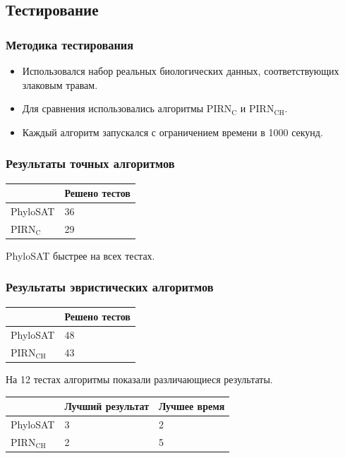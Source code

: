 \documentclass[hyperref={unicode}]{beamer}
\begin{document}
\subsection{Тестирование}

\begin{frame}
\frametitle{Методика тестирования}

\begin{itemize}
	\item Использовался набор реальных биологических данных, соответствующих злаковым травам.
	\item Для сравнения использовались алгоритмы $\mathrm{PIRN_C}$ и $\mathrm{PIRN_{CH}}$.
	\item Каждый алгоритм запускался с ограничением времени в 1000 секунд.
\end{itemize}

\end{frame}

\begin{frame}
\frametitle{Результаты точных алгоритмов}

\begin{table}
\begin{tabular}{l | l}
	& Решено тестов \\
	\hline
	PhyloSAT & 36 \\
	PIRN$\mathrm{_C}$ & 29 \\
\end{tabular}
\end{table}

PhyloSAT быстрее на всех тестах.

\end{frame}

\begin{frame}
\frametitle{Результаты эвристических алгоритмов}

\begin{table}
\begin{tabular}{l | l}
	& Решено тестов \\
	\hline
	PhyloSAT & 48 \\
	PIRN$\mathrm{_{CH}}$ & 43 \\
\end{tabular}
\end{table}

На 12 тестах алгоритмы показали различающиеся результаты.

\begin{table}
\begin{tabular}{l | l | l}
	& Лучший результат & Лучшее время \\
	\hline
	PhyloSAT & 3 & 2 \\
	PIRN$\mathrm{_{CH}}$ & 2 & 5 \\
\end{tabular}
\end{table}

\end{frame}
\end{document}
